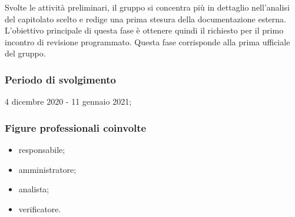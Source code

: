 Svolte le attività preliminari, il gruppo si concentra più in dettaglio nell'analisi del capitolato scelto e redige una prima stesura della documentazione esterna. L'obiettivo principale di questa fase è ottenere quindi il  richiesto per il primo incontro di revisione programmato. Questa fase corrisponde alla prima  ufficiale del gruppo.
        
        \subsubsection{Periodo di svolgimento}
        4 dicembre 2020 - 11 gennaio 2021;
        
        \subsubsection{Figure professionali coinvolte}
            \begin{itemize}
                \item responsabile;
                \item amministratore;
                \item analista;
                \item verificatore.
            \end{itemize}
        
